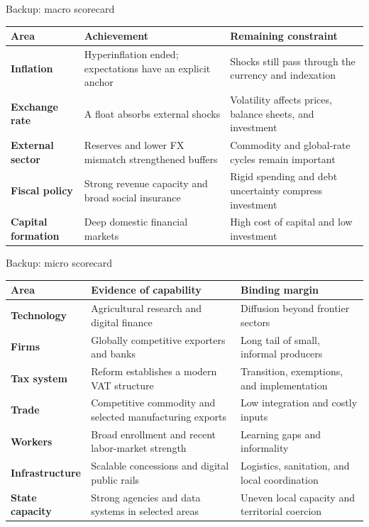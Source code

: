 \documentclass[10pt,aspectratio=169]{beamer}
\begin{document}
\begin{frame}{Backup: macro scorecard}
  \scriptsize
  \begin{tabularx}{\textwidth}{>{\bfseries}p{2.4cm}XX}
    \toprule
    Area & Achievement & Remaining constraint \\
    \midrule
    Inflation & Hyperinflation ended; expectations have an explicit anchor & Shocks still pass through the currency and indexation \\
    Exchange rate & A float absorbs external shocks & Volatility affects prices, balance sheets, and investment \\
    External sector & Reserves and lower FX mismatch strengthened buffers & Commodity and global-rate cycles remain important \\
    Fiscal policy & Strong revenue capacity and broad social insurance & Rigid spending and debt uncertainty compress investment \\
    Capital formation & Deep domestic financial markets & High cost of capital and low investment \\
    \bottomrule
  \end{tabularx}
\end{frame}

\begin{frame}{Backup: micro scorecard}
  \scriptsize
  \begin{tabularx}{\textwidth}{>{\bfseries}p{2.25cm}XX}
    \toprule
    Area & Evidence of capability & Binding margin \\
    \midrule
    Technology & Agricultural research and digital finance & Diffusion beyond frontier sectors \\
    Firms & Globally competitive exporters and banks & Long tail of small, informal producers \\
    Tax system & Reform establishes a modern VAT structure & Transition, exemptions, and implementation \\
    Trade & Competitive commodity and selected manufacturing exports & Low integration and costly inputs \\
    Workers & Broad enrollment and recent labor-market strength & Learning gaps and informality \\
    Infrastructure & Scalable concessions and digital public rails & Logistics, sanitation, and local coordination \\
    State capacity & Strong agencies and data systems in selected areas & Uneven local capacity and territorial coercion \\
    \bottomrule
  \end{tabularx}
\end{frame}
\end{document}
